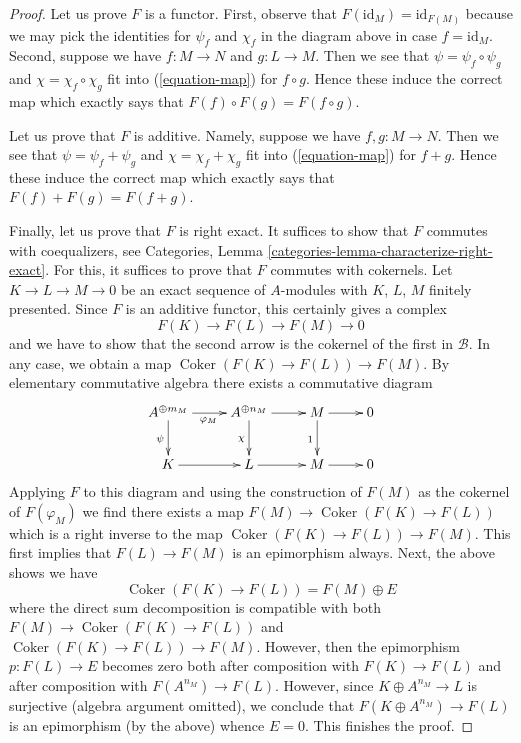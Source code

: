 \documentclass[10pt,a4paper]{amsart}
\theoremstyle{plain}
\theoremstyle{definition}
\theoremstyle{remark}
\numberwithin{equation}{subsection}
\def\Coker{\mathop{\mathrm{Coker}}}
\begin{document}
\begin{proof}
\medskip\noindent
Let us prove $F$ is a functor. First, observe that
$F(\text{id}_M) = \text{id}_{F(M)}$ because we may pick
the identities for $\psi_f$ and $\chi_f$ in the diagram above
in case $f = \text{id}_M$. Second, suppose we have
$f : M \to N$ and $g : L \to M$. Then we see that
$\psi = \psi_f \circ \psi_g$ and $\chi = \chi_f \circ \chi_g$
fit into (\ref{equation-map}) for $f \circ g$.
Hence these induce the correct map which exactly
says that $F(f) \circ F(g) = F(f \circ g)$.

\medskip\noindent
Let us prove that $F$ is additive. Namely, suppose we have
$f, g : M \to N$. Then we see that $\psi = \psi_f + \psi_g$ and
$\chi = \chi_f + \chi_g$ fit into (\ref{equation-map}) for $f + g$.
Hence these induce the correct map which exactly
says that $F(f) + F(g) = F(f + g)$.

\medskip\noindent
Finally, let us prove that $F$ is right exact. It suffices to show that $F$
commutes with coequalizers, see
Categories, Lemma \ref{categories-lemma-characterize-right-exact}.
For this, it suffices to prove that $F$ commutes with cokernels.
Let $K \to L \to M \to 0$ be an exact sequence of $A$-modules
with $K$, $L$, $M$ finitely presented. Since $F$ is an additive
functor, this certainly gives a complex
$$
F(K) \to F(L) \to F(M) \to 0
$$
and we have to show that the second arrow is the cokernel of the first
in $\mathcal{B}$. In any case, we obtain a map
$\Coker(F(K) \to F(L)) \to F(M)$.
By elementary commutative algebra there exists a commutative diagram
$$
\xymatrix{
A^{\oplus m_M} \ar[r]_{\varphi_M} \ar[d]_\psi &
A^{\oplus n_M} \ar[r] \ar[d]_\chi &
M \ar[r] \ar[d]_1 & 0 \\
K \ar[r] &
L \ar[r] &
M \ar[r] & 0
}
$$
Applying $F$ to this diagram and using the construction of $F(M)$ as
the cokernel of $F(\varphi_M)$ we find there exists a map
$F(M) \to \Coker(F(K) \to F(L))$ which is a right inverse
to the map $\Coker(F(K) \to F(L)) \to F(M)$. This first implies
that $F(L) \to F(M)$ is an epimorphism always. Next, the above shows
we have
$$
\Coker(F(K) \to F(L)) = F(M) \oplus E
$$
where the direct sum decomposition is compatible with both
$F(M) \to \Coker(F(K) \to F(L))$ and $\Coker(F(K) \to F(L)) \to F(M)$.
However, then the epimorphism $p : F(L) \to E$ becomes zero both
after composition with $F(K) \to F(L)$ and after composition
with $F(A^{n_M}) \to F(L)$. However, since $K \oplus A^{n_M} \to L$
is surjective (algebra argument omitted), we conclude that
$F(K \oplus A^{n_M}) \to F(L)$ is an epimorphism (by the above)
whence $E = 0$. This finishes the proof.
\end{proof}
\end{document}
